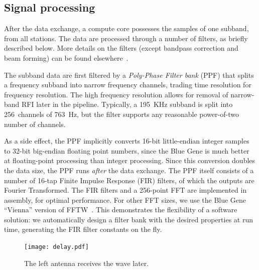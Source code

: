 \documentclass{sig-alternate}
\begin{document}
\subsection{Signal processing}
\label{sec:signal-processing}

After the data exchange, a compute core possesses the samples of one subband,
from all stations.
The data are processed through a number of filters, as briefly described below.
More details on the filters (except bandpass correction and beam forming)
can be found elsewhere~\cite{Romein:06}.

The subband data are first filtered by a \emph{Poly-Phase Filter bank\/} (PPF) that
splits a frequency subband into narrow frequency channels, trading time
resolution for frequency resolution.
The high frequency resolution allows for removal of narrow-band RFI later in
the pipeline.
Typically, a 195~KHz subband is split into 256~channels of 763~Hz, but the
filter supports any reasonable power-of-two number of channels.

As a side effect, the PPF implicitly converts 16-bit little-endian integer
samples to 32-bit big-endian floating point numbers, since the Blue Gene is
much better at floating-point processing than integer processing.
Since this conversion doubles the data size, the PPF runs \emph{after\/} the
data exchange.
The PPF itself consists of a number of 16-tap Finite Impulse Response (FIR)
filters, of which the outputs are Fourier Transformed.
The FIR filters and a 256-point FFT are implemented in assembly, for optimal
performance.
For other FFT sizes, we use the Blue Gene ``Vienna'' version of
FFTW~\cite{Lorenz:05}.
This demonstrates the flexibility of a software solution: we
automatically design a filter bank with the desired properties at run
time, generating the FIR filter constants on the fly.


\begin{figure}[ht]
\begin{center}
\texttt{[image: delay.pdf]}
\end{center}
\caption{The left antenna receives the wave later.}
\label{fig:delay}
\end{figure}
\end{document}
